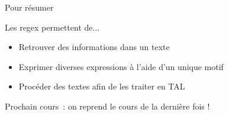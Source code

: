 \documentclass[serif, aspectratio=169]{beamer}
\begin{document}
\begin{frame}{Pour résumer}
    \begin{block}{Les regex permettent de...}
        \begin{itemize}
            \item Retrouver des informations dans un texte
            \item Exprimer diverses expressions à l'aide d'un unique motif
            \item Procéder des textes afin de les traiter en TAL
        \end{itemize}
    \end{block}
    \vspace{15pt}
    \begin{center}
        \Large
        Prochain cours~: on reprend le cours de la dernière fois !
    \end{center}
\end{frame}

\end{document}
